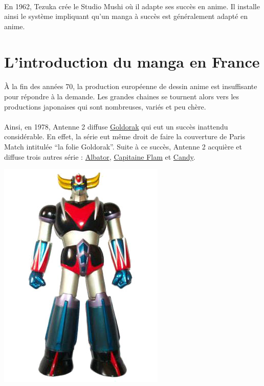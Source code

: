 \paragraph{} En 1962, Tezuka crée le Studio Mushi où il adapte ses succès en
anime. Il installe ainsi le système impliquant qu'un manga à succès est
généralement adapté en anime.

\section{L'introduction du manga en France}

\paragraph{} À la fin des années 70, la production européenne de dessin anime
est insuffisante pour répondre à la demande. Les grandes chaines se tournent
alors vers les productions japonaises qui sont nombreuses, variés et peu chère.

\paragraph{} Ainsi, en 1978, Antenne 2 diffuse \underline{Goldorak} qui eut un
succès inattendu considérable. En effet, la série eut même droit de faire la
couverture de Paris Match intitulée ``la folie Goldorak''.  Suite à ce succès,
Antenne 2 acquière et diffuse trois autres série : \underline{Albator},
\underline{Capitaine Flam} et \underline{Candy}.

\begin{center}
	\includegraphics[scale=0.4]{goldorak.jpg}
\end{center}

